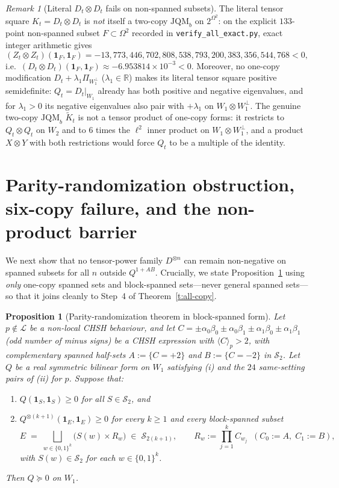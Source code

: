 \documentclass[11pt,a4paper]{article}
\newtheorem{proposition}[theorem]{Proposition}
\theoremstyle{definition}
\theoremstyle{remark}
\newtheorem{remark}[theorem]{Remark}
\newcommand{\ind}[1]{\mathbf{1}_{#1}}
\newcommand{\ev}[1]{\langle #1\rangle_p}
\newcommand{\JQMb}{\mathrm{JQM}_b}
\newcommand{\QAB}{Q^{1+AB}}
\newcommand{\Loc}{\mathcal{L}}
\begin{document}
\begin{remark}[Literal $D_t \otimes D_t$ fails on non-spanned subsets]\label{r:nonspanned}
The literal tensor square $K_t = D_t \otimes D_t$ is \emph{not} itself a two-copy $\JQMb$ on $2^{\Omega^2}$: on the explicit $133$-point non-spanned subset $F \subset \Omega^2$ recorded in \texttt{verify\_all\_exact.py}, exact integer arithmetic gives
\[
  (Z_t \otimes Z_t)(\ind F, \ind F) = -13{,}773{,}446{,}702{,}808{,}538{,}793{,}200{,}383{,}356{,}544{,}768 < 0,
\]
i.e.\ $(D_t \otimes D_t)(\ind F, \ind F) \approx -6.953814 \times 10^{-3} < 0$. Moreover, no one-copy modification $D_t + \lambda_1 \Pi_{W_1^\perp}$ ($\lambda_1 \in \mathbb{R}$) makes its literal tensor square positive semidefinite: $Q_t = D_t|_{W_1}$ already has both positive and negative eigenvalues, and for $\lambda_1 > 0$ its negative eigenvalues also pair with $+\lambda_1$ on $W_1 \otimes W_1^\perp$. The genuine two-copy $\JQMb$ $\widetilde{K}_t$ is not a tensor product of one-copy forms: it restricts to $Q_t \otimes Q_t$ on $W_2$ and to $6$ times the $\ell^2$ inner product on $W_1 \otimes W_1^\perp$, and a product $X \otimes Y$ with both restrictions would force $Q_t$ to be a multiple of the identity.
\end{remark}

\section{Parity-randomization obstruction, six-copy failure, and the non-product barrier}\label{s:powers}

We next show that no tensor-power family $D^{\otimes n}$ can remain non-negative on spanned subsets for all $n$ outside $\QAB$. Crucially, we state Proposition~\ref{p:parity} using \emph{only} one-copy spanned sets and block-spanned sets---never general spanned sets---so that it joins cleanly to Step~4 of Theorem~\ref{t:all-copy}.

\begin{proposition}[Parity-randomization theorem in block-spanned form]\label{p:parity}
Let $p \notin \Loc$ be a non-local CHSH behaviour, and let $C = \pm \alpha_0\beta_0 \pm \alpha_0\beta_1 \pm \alpha_1\beta_0 \pm \alpha_1\beta_1$ (odd number of minus signs) be a CHSH expression with $\ev{C} > 2$, with complementary spanned half-sets $A := \{C = +2\}$ and $B := \{C = -2\}$ in $\mathcal{S}_2$. Let $Q$ be a real symmetric bilinear form on $W_1$ satisfying (i) and the $24$ same-setting pairs of (ii) for $p$. Suppose that:
\begin{enumerate}
  \item $Q(\ind S, \ind S) \ge 0$ for all $S \in \mathcal{S}_2$, and
  \item $Q^{\otimes(k+1)}(\ind E, \ind E) \ge 0$ for every $k \ge 1$ and every block-spanned subset
  \[
    E \;=\; \bigsqcup_{w \in \{0,1\}^k} \bigl(S(w) \times R_w\bigr) \;\in\; \mathcal{S}_{2(k+1)}, \qquad R_w := \prod_{j=1}^k C_{w_j}\;\; (C_0 := A,\; C_1 := B),
  \]
  with $S(w) \in \mathcal{S}_2$ for each $w \in \{0,1\}^k$.
\end{enumerate}
Then $Q \succeq 0$ on $W_1$.
\end{proposition}
\end{document}
